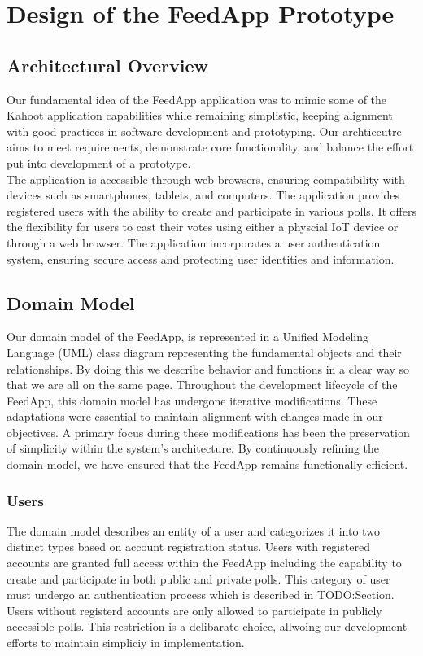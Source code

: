\clearpage
\section{Design of the FeedApp Prototype}
\label{sec:design}

\subsection{Architectural Overview} 

Our fundamental idea of the FeedApp application was to mimic some of the Kahoot application capabilities while remaining simplistic, keeping alignment with good practices in software development and prototyping.  Our archtiecutre aims to meet requirements, demonstrate core functionality, and balance the effort put into development of a prototype.  \\

\noindent The application is accessible through web browsers, ensuring compatibility with devices such as smartphones, tablets, and computers.  The application provides registered users with the ability to create and participate in various polls.  It offers the flexibility for users to cast their votes using either a physcial IoT device or through a web browser.  The application incorporates a user authentication system, ensuring secure access and protecting user identities and information.

\subsection{Domain Model} 
Our domain model of the FeedApp, is represented in a Unified Modeling Language (UML) class diagram representing the fundamental objects and their relationships. By doing this we describe  behavior and functions in a clear way so that we are all on the same page.  Throughout the development lifecycle of the FeedApp, this domain model has undergone iterative modifications. These adaptations were essential to maintain alignment with changes made in our objectives.  A primary focus during these modifications has been the preservation of simplicity within the system's architecture. By continuously refining the domain model, we have ensured that the FeedApp remains functionally efficient.

\subsubsection{Users}
The domain model describes an entity of a user and categorizes it into two distinct types based on account registration status.  Users with registered accounts are granted full access within the FeedApp including the capability to create and participate in both public and private polls.  This category of user must undergo an authentication process which is described in TODO:Section.  Users without registerd accounts are only allowed to participate in publicly accessible  polls.  This restriction is a delibarate choice, allwoing our development efforts to maintain simpliciy in implementation.  

